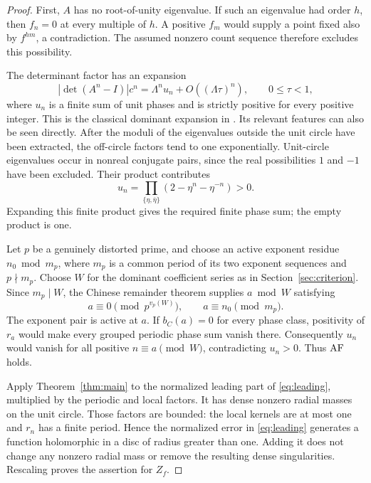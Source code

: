 \begin{proof}
First, \(A\) has no root-of-unity eigenvalue. If such an eigenvalue
had order \(h\), then \(f_n=0\) at every multiple of \(h\).
A positive \(f_m\) would supply a point fixed also by \(f^{hm}\),
a contradiction. The assumed nonzero count sequence therefore
excludes this possibility.

The determinant factor has an expansion
\begin{equation}\label{eq:leading}
|\det(A^n-I)|c^n=\Lambda^n u_n+O((\Lambda\tau)^n),
\qquad 0\leq\tau<1,
\end{equation}
where \(u_n\) is a finite sum of unit phases and is strictly positive
for every positive integer. This is the classical dominant expansion
in \citep[Section 10.3, especially Lemma 10.3.10]{bch2024}.
Its relevant features can also be seen directly. After the moduli of
the eigenvalues outside the unit circle have been extracted, the
off-circle factors tend to one exponentially. Unit-circle eigenvalues
occur in nonreal conjugate pairs, since the real possibilities \(1\)
and \(-1\) have been excluded. Their product contributes
\[
u_n=\prod_{\{\eta,\bar\eta\}}
(2-\eta^n-\eta^{-n})>0.
\]
Expanding this finite product gives the required finite phase sum;
the empty product is one.

Let \(p\) be a genuinely distorted prime, and choose an active
exponent residue \(n_0\bmod m_p\), where \(m_p\) is a common period of
its two exponent sequences and \(p\nmid m_p\). Choose \(W\) for the
dominant coefficient series as in Section~\ref{sec:criterion}.
Since \(m_p\mid W\), the Chinese remainder theorem supplies
\(a\bmod W\) satisfying
\[
a\equiv0\pmod{p^{v_p(W)}},
\qquad a\equiv n_0\pmod{m_p}.
\]
The exponent pair is active at \(a\). If \(b_C(a)=0\) for every phase
class, positivity of \(r_a\) would make every grouped periodic phase
sum vanish there. Consequently \(u_n\) would vanish for all positive
\(n\equiv a\pmod W\), contradicting \(u_n>0\).
Thus \(\mathrm{AF}\) holds.

Apply Theorem~\ref{thm:main} to the normalized leading part of
\eqref{eq:leading}, multiplied by the periodic and local factors.
It has dense nonzero radial masses on the unit circle.
Those factors are bounded: the local kernels are at most one and
\(r_n\) has a finite period. Hence the normalized error in
\eqref{eq:leading} generates a function holomorphic in a disc of
radius greater than one. Adding it does not change any nonzero
radial mass or remove the resulting dense singularities. Rescaling
proves the assertion for \(Z_f\).


\end{proof}
